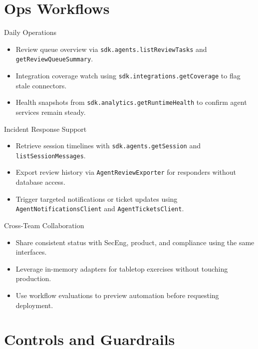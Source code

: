 \documentclass[aspectratio=169]{beamer}
\begin{document}
\section{Ops Workflows}

\begin{frame}{Daily Operations}
  \begin{itemize}
    \item Review queue overview via \texttt{sdk.agents.listReviewTasks} and \texttt{getReviewQueueSummary}.
    \item Integration coverage watch using \texttt{sdk.integrations.getCoverage} to flag stale connectors.
    \item Health snapshots from \texttt{sdk.analytics.getRuntimeHealth} to confirm agent services remain steady.
  \end{itemize}
\end{frame}

\begin{frame}{Incident Response Support}
  \begin{itemize}
    \item Retrieve session timelines with \texttt{sdk.agents.getSession} and \texttt{listSessionMessages}.
    \item Export review history via \texttt{AgentReviewExporter} for responders without database access.
    \item Trigger targeted notifications or ticket updates using \texttt{AgentNotificationsClient} and \texttt{AgentTicketsClient}.
  \end{itemize}
\end{frame}

\begin{frame}{Cross-Team Collaboration}
  \begin{itemize}
    \item Share consistent status with SecEng, product, and compliance using the same interfaces.
    \item Leverage in-memory adapters for tabletop exercises without touching production.
    \item Use workflow evaluations to preview automation before requesting deployment.
  \end{itemize}
\end{frame}

\section{Controls and Guardrails}
\end{document}
